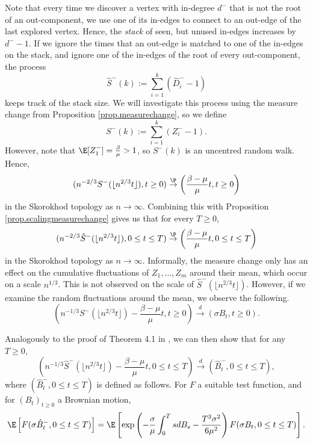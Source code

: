 Note that every time we discover a vertex with in-degree $d^-$ that is not the root of an out-component, we use one of its in-edges to connect to an out-edge of the last explored vertex. Hence, the \emph{stack} of seen, but unused in-edges increases by $d^--1$. If we ignore the times that an out-edge is matched to one of the in-edges on the stack, and ignore one of the in-edges of the root of every out-component, the process 
$$\hat{S}^-(k):=\sum\limits_{i=1}^k(\hat{D}^-_i-1)$$ keeps track of the stack size. We will investigate this process using the measure change from Proposition \ref{prop.measurechange}, so we define 
$${S}^-(k):=\sum\limits_{i=1}^k(Z^-_i-1).$$
However, note that $\E[Z^-_1]=\frac{\beta}{\mu}>1$, so ${S}^-(k)$ is an uncentred random walk. Hence,
\begin{equation}\label{eq.convergenceinprocess} (n^{-2/3}{S}^-(\lfloor n^{2/3}t\rfloor),t\geq 0) \overset{\P}{\to} \left(\frac{\beta-\mu}{\mu}t, t\geq 0\right)\end{equation}
in the Skorokhod topology as $n\to \infty$.
Combining this with Proposition \ref{prop.scalingmeasurechange} gives us that for every $T\geq 0$,
\begin{equation}\label{eq.convergenceorderedinedges} (n^{-2/3}\hat{S}^-(\lfloor n^{2/3}t\rfloor),0\leq t \leq T) \overset{\P}{\to} \left(\frac{\beta-\mu}{\mu}t, 0\leq t \leq T \right)\end{equation}
in the Skorokhod topology as $n\to \infty$.
Informally, the measure change only has an effect on the cumulative fluctuations of $Z_1,\dots,Z_m$ around their mean, which occur on a scale $n^{1/3}$. This is not observed on the scale of $\hat{S}^-(\lfloor n^{2/3}t\rfloor)$. However, if we examine the random fluctuations around the mean, we observe the following. 
\begin{equation}\label{eq.convergencein-edges}\left(n^{-1/3}{S}^-(\lfloor n^{2/3}t\rfloor)-\frac{\beta-\mu}{\mu}t ,t\geq 0\right) \overset{d}{\to} \left(\sigma B_t, t\geq 0\right).\end{equation}


Analogously to the proof of Theorem 4.1 in \cite{conchon--kerjanStableGraphMetric2020}, we can then show that for any $T\geq 0$,
$$\left(n^{-1/3}{\hat{S}}^-(\lfloor n^{2/3}t\rfloor)-\frac{\beta-\mu}{\mu}t ,0\leq t\leq T\right) \overset{d}{\to} \left( \hat{B}^-_t, 0\leq t \leq T \right),$$
where $(\hat{B}^-_t,0\leq t \leq T)$ is defined as follows. For $F$ a suitable test function, and for $(B_t)_{t\geq 0}$ a Brownian motion,
\begin{equation}\label{eq.measurechangeapplied} \E\left[F(\sigma\hat{B}^-_t,0\leq t \leq T)\right]=\E\left[\exp\left(-\frac{\sigma}{\mu}\int_0^T sdB_s - \frac{T^3 \sigma^2}{6\mu^2}\right)F(\sigma{B}_t,0\leq t \leq T)\right].\end{equation}
